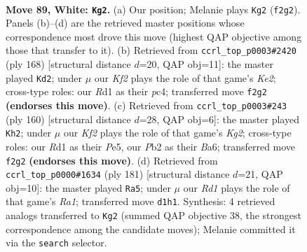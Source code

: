 \documentclass[11pt]{article}
\begin{document}
\clearpage

\begin{figure}[p]\centering
\begin{subfigure}{0.46\textwidth}\centering
\resizebox{\linewidth}{!}{%
\newchessgame
\chessboard[
  setfen={7r/8/p3k3/Ppp2p1p/2p2P1P/4P1P1/1P3K2/3R4 w - - 23 89},
  showmover=false,
  pgfstyle=straightmove, color=movearrow, markmove={f2-g2}
]}
\caption{}
\end{subfigure}\hfill
\begin{subfigure}{0.46\textwidth}\centering
\resizebox{\linewidth}{!}{%
\newchessgame
\chessboard[
  setfen={8/5k2/1p2p3/1P3p1p/2pP2pP/4P1P1/4KP2/8 w - - 0 85},
  showmover=false,
  pgfstyle=straightmove, color=movearrow, markmove={e2-d2}
]}
\caption{}
\end{subfigure}
\\[4pt]
\begin{subfigure}{0.46\textwidth}\centering
\resizebox{\linewidth}{!}{%
\newchessgame
\chessboard[
  setfen={8/p3k3/Bb4p1/4Pp1p/1p3P1P/1P4P1/P5K1/8 w - - 80 81},
  showmover=false,
  pgfstyle=straightmove, color=movearrow, markmove={g2-h2}
]}
\caption{}
\end{subfigure}\hfill
\begin{subfigure}{0.46\textwidth}\centering
\resizebox{\linewidth}{!}{%
\newchessgame
\chessboard[
  setfen={r7/2p5/3p2pk/3Pp1p1/1RP1P3/5PKP/8/8 b - - 0 91},
  showmover=false,
  pgfstyle=straightmove, color=movearrow, markmove={a8-a5}
]}
\caption{}
\end{subfigure}
\caption{\textbf{Move 89, White: \texttt{Kg2}.} (a) Our position; Melanie plays \texttt{Kg2} (\texttt{f2g2}). Panels (b)--(d) are the retrieved master positions whose correspondence most drove this move (highest QAP objective among those that transfer to it). (b) Retrieved from \texttt{ccrl\_top\_p0003\#2420} (ply 168) [structural distance $d$=20, QAP obj=11]: the master played \texttt{Kd2}; under $\mu$ our \emph{Kf2} plays the role of that game's \emph{Ke2}; cross-type roles: our \emph{R}d1 as their \emph{p}c4; transferred move \texttt{f2g2} \textbf{(endorses this move)}. (c) Retrieved from \texttt{ccrl\_top\_p0003\#243} (ply 160) [structural distance $d$=28, QAP obj=6]: the master played \texttt{Kh2}; under $\mu$ our \emph{Kf2} plays the role of that game's \emph{Kg2}; cross-type roles: our \emph{R}d1 as their \emph{P}e5, our \emph{P}b2 as their \emph{B}a6; transferred move \texttt{f2g2} \textbf{(endorses this move)}. (d) Retrieved from \texttt{ccrl\_top\_p0000\#1634} (ply 181) [structural distance $d$=21, QAP obj=10]: the master played \texttt{Ra5}; under $\mu$ our \emph{Rd1} plays the role of that game's \emph{Ra1}; transferred move \texttt{d1h1}. Synthesis: 4 retrieved analogs transferred to \texttt{Kg2} (summed QAP objective 38, the strongest correspondence among the candidate moves); Melanie committed it via the \texttt{search} selector.}
\label{fig:thought-m176}
\end{figure}
\end{document}
